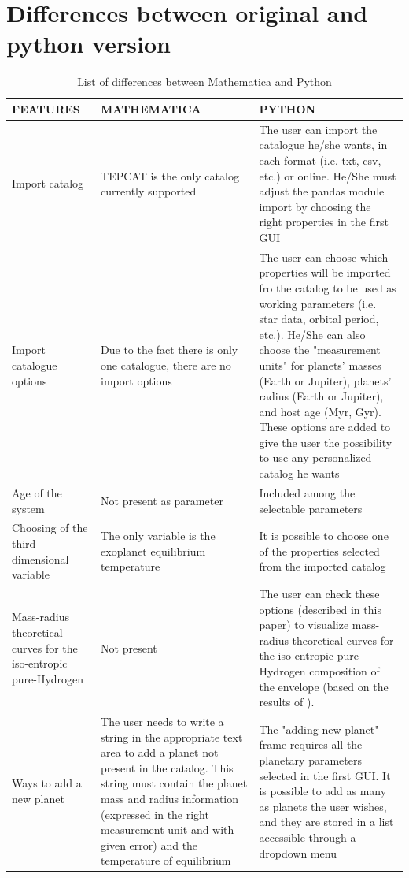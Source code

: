 \documentclass[preprint,12pt]{elsarticle}
\begin{document}
    \section{Differences between original and python version}
     	\begin{center}
    		\centering
    		\begin{longtable}{|p{2.5cm}|p{5cm}|p{6cm}|}
    			\caption{List of differences between Mathematica and Python}
    			\label{table:table_argument}
    			\endfirsthead
    			\endhead
    			\hline
    			\textbf{FEATURES} & \textbf{MATHEMATICA} & \textbf{PYTHON} \\ [0.5ex] 
    			\hline\hline
    			Import catalog & TEPCAT is the only catalog currently supported & The user can import the catalogue he/she wants, in each format (i.e. txt, csv, etc.) or online. He/She must adjust the pandas module import by choosing the right properties in the first GUI \\ 
    			\hline
    			Import catalogue options & Due to the fact there is only one catalogue, there are no import options & The user can choose which properties will be imported fro the catalog to be used as working parameters (i.e. star data, orbital period, etc.). He/She can also choose the "measurement units" for planets' masses (Earth or Jupiter), planets' radius (Earth or Jupiter), and host age (Myr, Gyr). These options are added to give the user the possibility to use any personalized catalog he wants \\
    			\hline
    			Age of the system & Not present as parameter & Included among the selectable parameters \\
    			\hline
    			Choosing of the third-dimensional variable & The only variable is the exoplanet equilibrium temperature & It is possible to choose one of the properties selected from the imported catalog \\
    			\hline
    			Mass-radius theoretical curves for the iso-entropic pure-Hydrogen & Not present & The user can check these options (described in this paper) to visualize mass-radius theoretical curves for the iso-entropic pure-Hydrogen composition of the envelope (based on the results of \textit{\cite{Becker2014}}). \\
    			\hline
    			Ways to add a new planet & The user needs to write a string in the appropriate text area to add a planet not present in the catalog. This string must contain the planet mass and radius information (expressed in the right measurement unit and with given error) and the temperature of equilibrium & The "adding new planet" frame requires all the planetary parameters selected in the first GUI. It is possible to add as many as planets the user wishes, and they are stored in a list accessible through a dropdown menu \\
    			\hline
    		\end{longtable}
    	\end{center}
	
\end{document}
